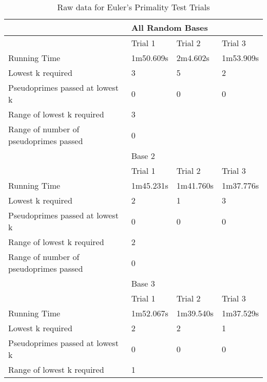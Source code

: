 \documentclass{article}
\begin{document}
\FloatBarrier
\begin{table}[h]
\caption{Raw data for Euler's Primality Test Trials}
\begin{tabular}{@{}llll@{}}
\toprule
                                       & \multicolumn{3}{l}{All Random Bases}  \\ \midrule
                                       & Trial 1     & Trial 2    & Trial 3    \\
Running Time                           & 1m50.609s   & 2m4.602s   & 1m53.909s  \\
Lowest k required                      & 3           & 5          & 2          \\
Pseudoprimes passed at lowest k        & 0           & 0          & 0          \\
Range of lowest k required             & \multicolumn{3}{l}{3}                 \\
Range of number of pseudoprimes passed & \multicolumn{3}{l}{0}                 \\\midrule
                                       & \multicolumn{3}{l}{Base 2}            \\\midrule
                                       & Trial 1     & Trial 2    & Trial 3    \\
Running Time                           & 1m45.231s   & 1m41.760s  & 1m37.776s  \\
Lowest k required                      & 2           & 1          & 3          \\
Pseudoprimes passed at lowest k        & 0           & 0          & 0          \\
Range of lowest k required             & \multicolumn{3}{l}{2}                 \\
Range of number of pseudoprimes passed & \multicolumn{3}{l}{0}                 \\\midrule
                                       & \multicolumn{3}{l}{Base 3}            \\\midrule
                                       & Trial 1     & Trial 2    & Trial 3    \\
Running Time                           & 1m52.067s   & 1m39.540s  & 1m37.529s  \\
Lowest k required                      & 2           & 2          & 1          \\
Pseudoprimes passed at lowest k        & 0           & 0          & 0          \\
Range of lowest k required             & \multicolumn{3}{l}{1}                 \\

\end{tabular}
\end{table}
\end{document}
